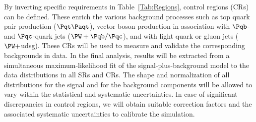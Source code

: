 \documentclass[a4paper,11pt]{article}
\newcommand{\Pb}{{{\Pqb}}\xspace}
\newcommand{\Pt}{{{\Pqt}}\xspace}
\newcommand{\Pc}{{{\Pqc}}\xspace}
\newcommand{\PAt}{{{{\Paqt}}}\xspace}
\begin{document}
By inverting specific requirements in  Table~\ref{Tab:Regions}, control regions (CRs) can be defined. 
These enrich the various background processes such as top quark pair production ($\Pt\PAt$), vector boson production in association with $\Pb$- and $\Pc$-quark jets (${\PW}+\Pb/\Pc$), and with light quark or gluon jets (${\PW}+$udsg). 
These CRs will be used to measure and validate the corresponding backgrounds in data.
In the final analysis, results will be extracted from a simultaneous maximum-likelihood fit of the signal-plus-background model to the data distributions in all SRs and CRs. The shape and normalization of all distributions for the signal and for the background components will be allowed to vary within the statistical and systematic uncertainties. In case of significant discrepancies in control regions, we will obtain suitable correction factors and the associated systematic uncertainties to calibrate the simulation.
\end{document}
